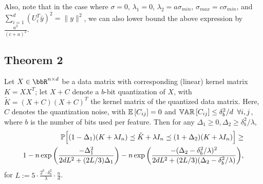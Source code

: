 \documentclass[12pt]{article}
\newcommand{\by}{\bar{y}}
\newcommand{\tK}{\tilde{K}}
\newcommand{\defeq}{:=}
\newcommand{\eqdef}{=:}
\begin{document}
Also, note that in the case where $\sigma = 0$, $\lambda_1 = 0$, $\lambda_2 = a \sigma_{min}$, $\sigma_{max} = c\sigma_{min}$, and $\sum_{i=1}^d (U_i^T \by)^2 = \|y\|^2$, we can also lower bound the above expression by $\frac{a^2}{(c+a)^2}$.

\subsection{Theorem 2}

\begin{theorem}
	\label{thm2}
	Let $X \in \RR^{n\times d}$ be a data matrix with corresponding (linear) kernel matrix $K = XX^T$; let $X+C$ denote a $b$-bit quantization of $X$, with $\tK = (X+C)(X+C)^T$ the kernel matrix of the quantized data matrix. Here, $C$ denotes the quantization noise, with $\expect{}{C_{ij}} = 0$ and $\var{}{C_{ij}} \leq \delta_b^2/d \;\;\forall i,j$, where $b$ is the number of bits used per feature.
	Then for any $\Delta_1 \geq 0, \Delta_2 \geq \delta^2_b/\lambda$,
	\begin{eqnarray}
	\Prob\Big[(1 - \Delta_1) (K + \lambda I_n) \preceq \tK + \lambda I_n \preceq (1 + \Delta_2) (K + \lambda I_n)
	\Big] 
	\geq \\ 1 - 
	n \exp \bigg(\frac{-\Delta_1^2}{2dL^2 + (2L/3)\Delta_1}\bigg) -
	n \exp \bigg(\frac{-(\Delta_2-\delta_b^2/\lambda)^2}{2dL^2 + (2L/3)(\Delta_2-\delta_b^2/\lambda)}\bigg),
	\end{eqnarray}
	for $L \defeq 5 \cdot \frac{2^b \cdot \delta_b^2}{\lambda}\cdot \frac{n}{d}$.
\end{theorem}


\end{document}
